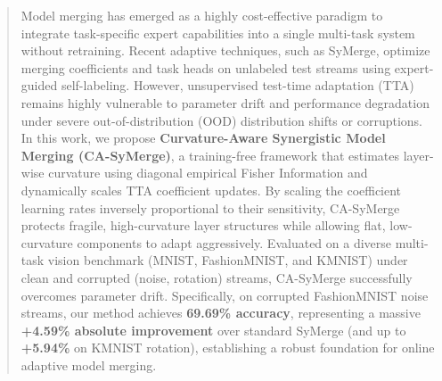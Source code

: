 \documentclass{article}
\begin{document}

\printAffiliationsAndNotice{\icmlEqualContribution}

\begin{abstract}
Model merging has emerged as a highly cost-effective paradigm to integrate task-specific expert capabilities into a single multi-task system without retraining. Recent adaptive techniques, such as SyMerge, optimize merging coefficients and task heads on unlabeled test streams using expert-guided self-labeling. However, unsupervised test-time adaptation (TTA) remains highly vulnerable to parameter drift and performance degradation under severe out-of-distribution (OOD) distribution shifts or corruptions. In this work, we propose \textbf{Curvature-Aware Synergistic Model Merging (CA-SyMerge)}, a training-free framework that estimates layer-wise curvature using diagonal empirical Fisher Information and dynamically scales TTA coefficient updates. By scaling the coefficient learning rates inversely proportional to their sensitivity, CA-SyMerge protects fragile, high-curvature layer structures while allowing flat, low-curvature components to adapt aggressively. Evaluated on a diverse multi-task vision benchmark (MNIST, FashionMNIST, and KMNIST) under clean and corrupted (noise, rotation) streams, CA-SyMerge successfully overcomes parameter drift. Specifically, on corrupted FashionMNIST noise streams, our method achieves \textbf{69.69\% accuracy}, representing a massive \textbf{+4.59\% absolute improvement} over standard SyMerge (and up to \textbf{+5.94\%} on KMNIST rotation), establishing a robust foundation for online adaptive model merging.
\end{abstract}
\end{document}
